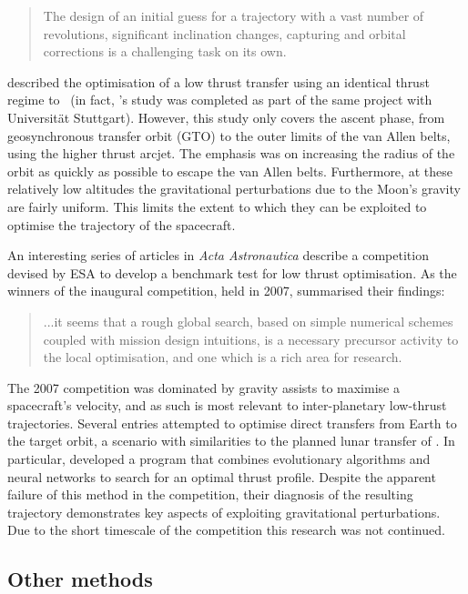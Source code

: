 \begin{quotation}The design of an initial guess for a trajectory with a vast number of revolutions, significant inclination changes, capturing and orbital corrections is a challenging task on its own.\end{quotation}

\textcite{Letterio_thesis} described the optimisation of a low thrust transfer using an identical thrust regime to \BW\ (in fact, \citeauthor{Letterio_thesis}'s study was completed as part of the same project with Universit\"{a}t Stuttgart). However, this study only covers the ascent phase, from geosynchronous transfer orbit (GTO) to the outer limits of the van Allen belts, using the higher thrust arcjet. The emphasis was on increasing the radius of the orbit as quickly as possible to escape the van Allen belts. Furthermore, at these relatively low altitudes the gravitational perturbations due to the Moon's gravity are fairly uniform. This limits the extent to which they can be exploited to optimise the trajectory of the spacecraft.

An interesting series of articles in \emph{Acta Astronautica} describe a competition devised by ESA to develop a benchmark test for low thrust optimisation. As the winners of the inaugural competition, held in 2007, \textcite{Petropoulos2007} summarised their findings: 

\begin{quotation}...it seems that a rough global search, based on simple numerical schemes coupled with mission design intuitions, is a necessary precursor activity to the local optimisation, and one which is a rich area for research.\end{quotation}

The 2007 competition was dominated by gravity assists to maximise a spacecraft's velocity, and as such is most relevant to inter-planetary low-thrust trajectories. Several entries attempted to optimise direct transfers from Earth to the target orbit, a scenario with similarities to the planned lunar transfer of \BW. In particular, \textcite{Dachwald2007} developed a program that combines evolutionary algorithms and neural networks to search for an optimal thrust profile. Despite the apparent failure of this method in the competition, their diagnosis of the resulting trajectory demonstrates key aspects of exploiting gravitational perturbations. Due to the short timescale of the competition this research was not continued.

\subsection{Other methods} \label{sub:Other-lit}

